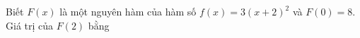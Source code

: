 \begin{ex}
Biết $F(x)$ là một nguyên hàm của hàm số $f(x)=3(x+2)^2$ và $F(0)=8$. Giá trị của $F(2)$ bằng
\end{ex}
